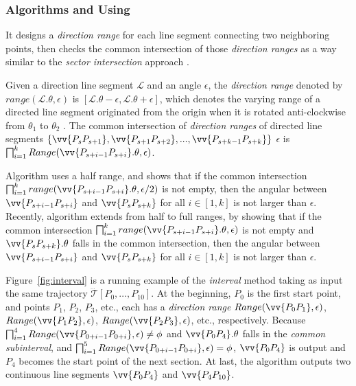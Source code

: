 \subsubsection{Algorithms \intersec \cite{Long:Direction} and \interval \cite{Ke:Interval} Using \dad}
It designs a \emph{direction range} for each line segment connecting two neighboring points, then checks the common intersection of those \emph{direction ranges} as a way similar to the \emph{sector intersection} approach \cite{Williams:Longest, Sklansky:Cone, Dunham:Cone, Zhao:Sleeve}.

Given a direction line segment $\mathcal{L}$ and an angle $\epsilon$, the \emph{direction range} denoted by $range(\mathcal{L}.\theta, \epsilon)$ is $[\mathcal{L}.\theta-\epsilon, \mathcal{L}.\theta+\epsilon]$, which denotes the varying range of a directed line segment originated from the origin when it is rotated anti-clockwise from $\theta_1$ to $\theta_2$  \cite{Long:Direction}.
%
The {common intersection} of \emph{direction ranges} of directed line segments $\{\vv{P_sP_{s+1}}, \vv{P_{s+1}P_{s+2}}, ..., \vv{P_{s+k-1}P_{s+k}}\}$ \wrt $\epsilon$ is $\bigsqcap_{i=1}^{k}Range(\vv{P_{s+i-1} P_{s+i}}.\theta, \epsilon)$.

Algorithm \intersec\cite{Long:Direction} uses a half range, and shows that if the {common intersection} $\bigsqcap_{i=1}^{k}range(\vv{P_{s+i-1} P_{s+i}}.\theta, \epsilon/2)$ is not empty, then the angular between $\vv{P_{s+i-1}P_{s+i}}$ and $\vv{P_sP_{s+k}}$ for all $i\in [1, k]$ is not larger than $\epsilon$.
%
Recently, algorithm \interval \cite{Ke:Interval} extends \intersec from half to full ranges, by showing that if the {common intersection} $\bigsqcap_{i=1}^{k}range(\vv{P_{s+i-1} P_{s+i}}.\theta, \epsilon)$ is not empty and $\vv{P_sP_{s+k}}.\theta$ falls in the {common intersection}, then the angular between $\vv{P_{s+i-1}P_{s+i}}$ and $\vv{P_sP_{s+k}}$ for all $i\in [1, k]$ is not larger than $\epsilon$.


\begin{example}
	\label{exm-alg-interval}
	Figure~\ref{fig:interval} is a running example of the \emph{interval} method taking as input the same trajectory $\dddot{\mathcal{T}}[P_0, \ldots, P_{10}]$. At the beginning, $P_0$ is the first start point, and points $P_1$, $P_2$, $P_3$, etc., each has a \emph{direction range} $Range(\vv{P_0P_1}, \epsilon)$, $Range(\vv{P_1P_2}, \epsilon)$, $Range(\vv{P_2P_3}, \epsilon)$, etc., respectively.
	Because $\bigsqcap_{i=1}^{4}Range(\vv{P_{0+i-1}P_{0+i}}, \epsilon) \ne \phi$ and $\vv{P_0P_{4}}.\theta$ falls in the \emph{common subinterval}, and $\bigsqcap_{i=1}^{5}Range(\vv{P_{0+i-1}P_{0+i}}, \epsilon) = \phi$, $\vv{P_0P_4}$ is output and $P_4$ becomes the start point of the next section.
	At last, the algorithm outputs two continuous line segments $\vv{P_0P_4}$ and $\vv{P_4P_{10}}$.
\end{example}





